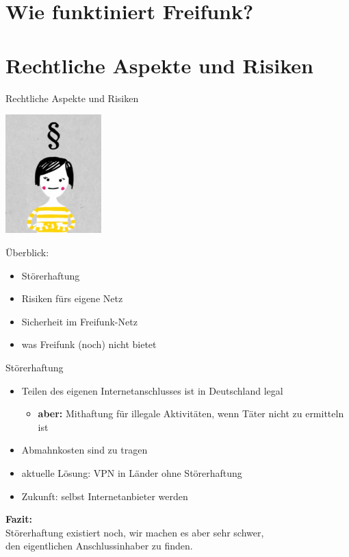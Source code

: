 \documentclass[handout, 10pt]{beamer}
\begin{document}
\section{Wie funktiniert Freifunk?}

\section{Rechtliche Aspekte und Risiken}
\begin{frame}{Rechtliche Aspekte und Risiken}
\begin{Row}
\begin{Cell}{1}
\vspace{0.1cm}
\includegraphics[width=3.7cm]{images/recht}
\end{Cell}
\begin{Cell}{2}
\vspace{1cm}
Überblick:
\begin{itemize}
\pause \item Störerhaftung
\pause \item Risiken fürs eigene Netz
\pause \item Sicherheit im Freifunk-Netz
\pause \item was Freifunk (noch) nicht bietet
\end{itemize}
\end{Cell}
\end{Row}
\end{frame}

\begin{frame}{Störerhaftung}
\begin{itemize}
\pause\item Teilen des eigenen Internetanschlusses ist in Deutschland legal
\begin{itemize}
	\pause\item \textbf{aber:} Mithaftung für illegale Aktivitäten, wenn Täter nicht zu ermitteln ist
\end{itemize}
\pause\item Abmahnkosten sind zu tragen
\vfill
\pause\item aktuelle Lösung: VPN in Länder ohne Störerhaftung
\pause\item Zukunft: selbst Internetanbieter werden
\end{itemize}
\vfill
\centering
\pause \textbf{Fazit:}\\Störerhaftung existiert noch, wir machen es aber sehr schwer,\\den eigentlichen Anschlussinhaber zu finden.

\end{frame}
\end{document}

